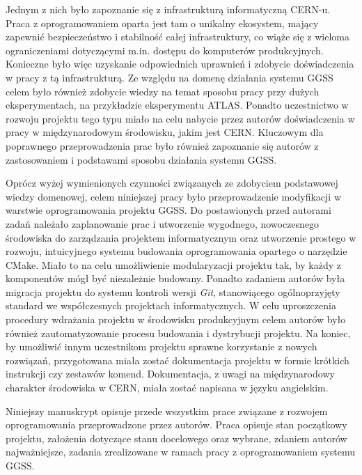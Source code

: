 Jednym z nich było zapoznanie się z infrastrukturą informatyczną CERN-u. Praca z oprogramowaniem oparta jest tam o unikalny ekosystem, mający zapewnić bezpieczeństwo i stabilność całej infrastruktury, co wiąże się z wieloma ograniczeniami dotyczącymi m.in. dostępu do komputerów produkcyjnych. Konieczne było więc uzyskanie odpowiednich uprawnień i zdobycie doświadczenia w pracy z tą infrastrukturą. Ze względu na domenę działania systemu GGSS celem było również zdobycie wiedzy na temat sposobu pracy przy dużych eksperymentach, na przykładzie eksperymentu ATLAS. Ponadto uczestnictwo w rozwoju projektu tego typu miało na celu nabycie przez autorów doświadczenia w pracy w międzynarodowym środowisku, jakim jest CERN. Kluczowym dla poprawnego przeprowadzenia prac było również zapoznanie się autorów z zastosowaniem i podstawami sposobu działania systemu GGSS. \par

Oprócz wyżej wymienionych czynności związanych ze zdobyciem podstawowej wiedzy domenowej, celem niniejszej pracy było przeprowadzenie modyfikacji w warstwie oprogramowania projektu GGSS. Do postawionych przed autorami zadań należało zaplanowanie prac i utworzenie wygodnego, nowoczesnego środowiska do zarządzania projektem informatycznym oraz utworzenie prostego w rozwoju, intuicyjnego systemu budowania oprogramowania opartego o narzędzie CMake. Miało to na celu umożliwienie modularyzacji projektu tak, by każdy z komponentów mógł być niezależnie budowany. Ponadto zadaniem autorów była migracja projektu do systemu kontroli wersji \textit{Git}, stanowiącego ogólnoprzyjęty standard we współczesnych projektach informatycznych. W celu uproszczenia procedury wdrażania projektu w środowisku produkcyjnym celem autorów było również zautomatyzowanie procesu budowania i dystrybucji projektu. Na koniec, by umożliwić innym uczestnikom projektu sprawne korzystanie z nowych rozwiązań, przygotowana miała zostać dokumentacja projektu w formie krótkich instrukcji czy zestawów komend. Dokumentacja, z uwagi na międzynarodowy charakter środowiska w CERN, miała zostać napisana w języku angielskim. \par

Niniejszy manuskrypt opisuje przede wszystkim prace związane z rozwojem oprogramowania przeprowadzone przez autorów. Praca opisuje stan początkowy projektu, założenia dotyczące stanu docelowego oraz wybrane, zdaniem autorów najważniejsze, zadania zrealizowane w ramach pracy z oprogramowaniem systemu GGSS.